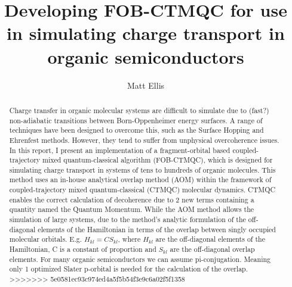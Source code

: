  \makeatletter
\renewcommand {\@degree@string} {Master of Philosophy to Doctor of Philosophy}
 \makeatother

\title{Developing FOB-CTMQC for use in simulating charge transport in organic semiconductors}
\author{Matt Ellis}

\maketitle
\begin{abstract} %
Charge transfer in organic molecular systems are difficult to simulate due to (fast?) non-adiabatic transitions between Born-Oppenheimer energy surfaces. A range of techniques have been designed to overcome this, such as the Surface Hopping and Ehrenfest methods. However, they tend to suffer from unphysical overcoherence issues. In this report, I present an implementation of a fragment-orbital based coupled-trajectory mixed quantum-classical algorithm (FOB-CTMQC), which is designed for simulating charge transport in systems of tens to hundreds of organic molecules. This method uses an in-house analytical overlap method (AOM) within the framework of coupled-trajectory mixed quantum-classical (CTMQC) molecular dynamics. CTMQC enables the correct calculation of decoherence due to 2 new terms containing a quantity named the Quantum Momentum. While the AOM method allows the simulation of large systems, due to the method's analytic formulation of the off-diagonal elements of the Hamiltonian in terms of the overlap between singly occupied molecular orbitals. E.g. $H_{kl} = CS_{kl} $, where $H_{kl}$ are the off-diagonal elements of the Hamiltonian, C is a constant of proportion and $S_{kl}$ are the off-diagonal overlap elements. For many organic semiconductors we can assume pi-conjugation. Meaning only 1 optimized Slater p-orbital is needed for the calculation of the overlap.
>>>>>>> 5e0581ec93c974ed4a5f5b54f3e9c6a02f5f1358
\end{abstract}

\setcounter{tocdepth}{2}

\tableofcontents
